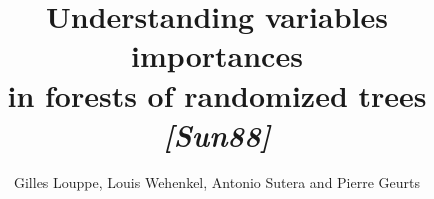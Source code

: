 \documentclass[handout]{beamer}
\title{Understanding variables importances\\
in forests of randomized trees {\it [Sun88]}\vspace{-3ex}}
\author{{\small Gilles Louppe, Louis Wehenkel, Antonio Sutera and Pierre Geurts}}
\date{}
\begin{document}

\begin{frame}
\maketitle
\vfill
\end{frame}



\begin{frame}

\end{frame}



\begin{frame}

\end{frame}



\begin{frame}

\end{frame}
\end{document}
